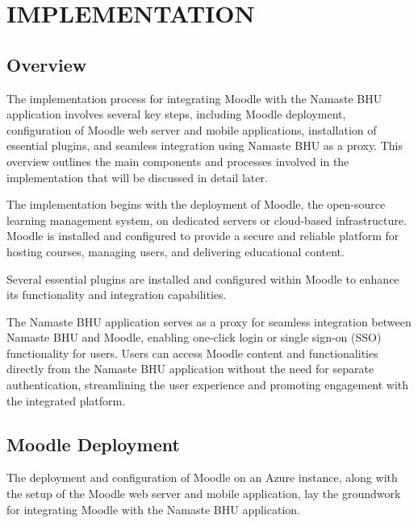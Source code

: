 \clearpage
\chapter{IMPLEMENTATION}

\section{Overview}
The implementation process for integrating Moodle with the Namaste BHU application involves several key steps, including Moodle deployment, configuration of Moodle web server and mobile applications, installation of essential plugins, and seamless integration using Namaste BHU as a proxy. This overview outlines the main components and processes involved in the implementation that will be discussed in detail later.

The implementation begins with the deployment of Moodle, the open-source learning management system, on dedicated servers or cloud-based infrastructure. Moodle is installed and configured to provide a secure and reliable platform for hosting courses, managing users, and delivering educational content.

Several essential plugins are installed and configured within Moodle to enhance its functionality and integration capabilities.

The Namaste BHU application serves as a proxy for seamless integration between Namaste BHU and Moodle, enabling one-click login or single sign-on (SSO) functionality for users. Users can access Moodle content and functionalities directly from the Namaste BHU application without the need for separate authentication, streamlining the user experience and promoting engagement with the integrated platform.

\section{Moodle Deployment}
The deployment and configuration of Moodle on an Azure instance, along with the setup of the Moodle web server and mobile application, lay the groundwork for integrating Moodle with the Namaste BHU application.

